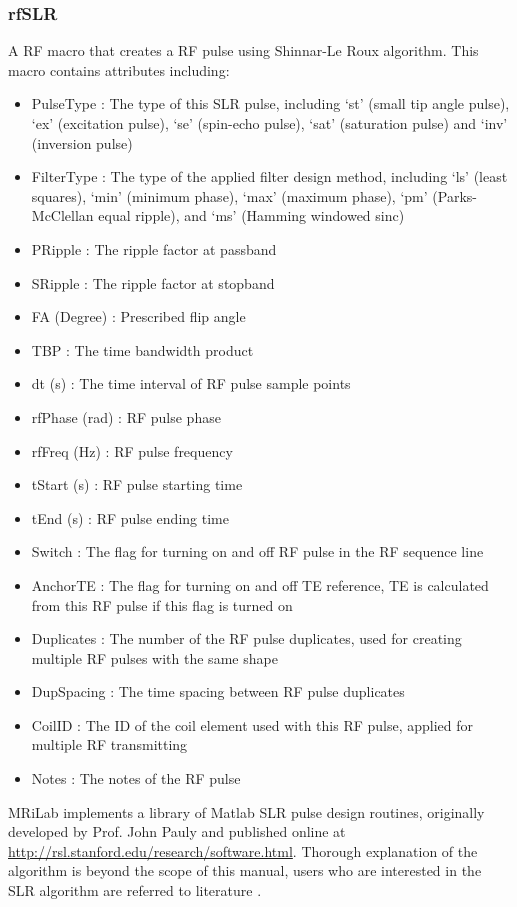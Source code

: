 \documentclass{book}%
\begin{document}
\subsubsection{rfSLR}

A RF macro that creates a RF pulse using Shinnar-Le Roux algorithm. This macro contains attributes including:

\begin{itemize}
	\item PulseType : The type of this SLR pulse, including `st' (small tip angle pulse), `ex' (excitation pulse), `se' (spin-echo pulse), `sat' (saturation pulse) and `inv' (inversion pulse)
	\item FilterType : The type of the applied filter design method, including `ls' (least squares), `min' (minimum phase), `max' (maximum phase), `pm' (Parks-McClellan equal ripple), and `ms' (Hamming windowed sinc)
	\item PRipple : The ripple factor at passband
	\item SRipple : The ripple factor at stopband
	\item FA (Degree) : Prescribed flip angle 
	\item TBP : The time bandwidth product
	\item dt (s) : The time interval of RF pulse sample points
	\item rfPhase (rad) : RF pulse phase
	\item rfFreq (Hz) : RF pulse frequency
	\item tStart (s) : RF pulse starting time
	\item tEnd (s) : RF pulse ending time
	\item Switch : The flag for turning on and off RF pulse in the RF sequence line
	\item AnchorTE : The flag for turning on and off TE reference, TE is calculated from this RF pulse if this flag is turned on
	\item Duplicates : The number of the RF pulse duplicates, used for creating multiple RF pulses with the same shape
	\item DupSpacing : The time spacing between RF pulse duplicates
	\item CoilID : The ID of the coil element used with this RF pulse, applied for multiple RF transmitting
	\item Notes : The notes of the RF pulse 
\end{itemize}

MRiLab implements a library of Matlab SLR pulse design routines, originally developed by Prof. John Pauly and published online at \url{http://rsl.stanford.edu/research/software.html}. Thorough explanation of the algorithm is beyond the scope of this manual, users who are interested in the SLR algorithm are referred to literature \cite{Handbook2004,Pauly1991}.
\end{document}
